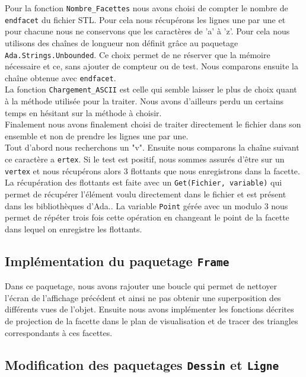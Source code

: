 \documentclass[10pt]{article}
\begin{document}
Pour la fonction \lstinline!Nombre_Facettes! nous avons choisi de compter le nombre de \lstinline!endfacet! du fichier STL. Pour cela nous récupérons les lignes une par une et pour chacune nous ne conservons que les caractères de 'a' à 'z'. Pour cela nous utilisons des chaînes de longueur non définit grâce au paquetage \lstinline!Ada.Strings.Unbounded!. Ce choix permet de ne réserver que la mémoire nécessaire et ce, sans ajouter de compteur ou de test. Nous comparons ensuite la chaîne obtenue avec \lstinline!endfacet!.\\
La fonction \lstinline!Chargement_ASCII! est celle qui semble laisser le plus de choix quant à la méthode utilisée pour la traiter. Nous avons d'ailleurs perdu un certains temps en hésitant sur la méthode à choisir.\\
Finalement nous avons finalement choisi de traiter directement le fichier dans son ensemble et non de prendre les lignes une par une.\\ 
Tout d'abord nous recherchons un "v". Ensuite nous comparons la chaîne suivant ce caractère a \lstinline!ertex!. Si le test est positif, nous sommes assurés d'être sur un \lstinline!vertex! et nous récupérons alors 3 flottants que nous enregistrons dans la facette. La récupération des flottants est faite avec un \lstinline!Get(Fichier, variable)! qui permet de récupérer l'élément voulu directement dans le fichier et est présent dans les bibliothèques d'Ada..
La variable \lstinline!Point! gérée avec un modulo 3 nous permet de répéter trois fois cette opération en changeant le point de la facette dans lequel on enregistre les flottants.

\subsection{Implémentation du paquetage \lstinline!Frame!}

Dans ce paquetage, nous avons rajouter une boucle qui permet de nettoyer l'écran de l'affichage précédent et ainsi ne pas obtenir une superposition des différents vues de l'objet.
Ensuite nous avons implémenter les fonctions décrites de projection de la facette dans le plan de visualisation et de tracer des triangles correspondants à ces facettes.

\subsection{Modification des paquetages \lstinline!Dessin! et \lstinline!Ligne!}
\end{document}
